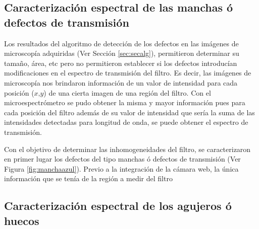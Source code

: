 
\singlespacing
\subsection{Caracterización espectral de las manchas ó defectos de transmisión}
\label{sec:defctma}

\hspace{0.5cm}Los resultados del algoritmo de detección de los defectos en las imágenes de microscopía adquiridas (Ver Sección \ref{sec:secalg}), permitieron determinar su tamaño, área, etc pero no permitieron establecer si los defectos introducían modificaciones en el espectro de transmisión del filtro. Es decir, las imágenes de microscopía nos brindaron información de un valor de intensidad para cada posición ($\textit{x,y}$) de una cierta imagen de una región del filtro. Con el microespectrómetro se pudo obtener la misma y mayor información pues para cada posición del filtro además de su valor de intensidad que sería la suma de las intensidades detectadas para longitud de onda, se puede obtener el espectro de transmisión.

Con el objetivo de determinar las inhomogeneidades del filtro, se caracterizaron en primer lugar los defectos del tipo manchas ó defectos de transmisión (Ver Figura \ref{fig:manchaazul}). Previo a la integración de la cámara web, la única información que se tenía de la región a medir del filtro




\singlespacing
\subsection{Caracterización espectral de los agujeros ó huecos}
\label{sec:defctag}
